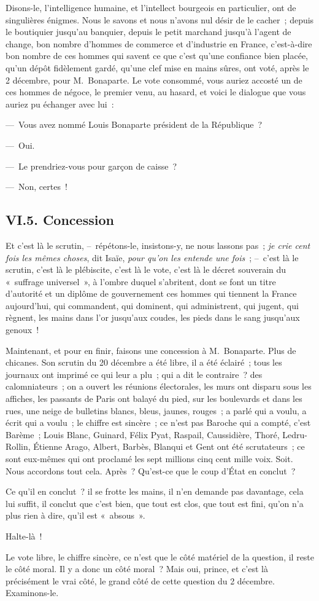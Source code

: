 \documentclass[french,twoside]{book} %
\begin{document}
Disons-le, l’intelligence humaine, et l’intellect bourgeois en particulier, ont de singulières énigmes. Nous le savons et nous n’avons nul désir de le cacher ; depuis le boutiquier jusqu’au banquier, depuis le petit marchand jusqu’à l’agent de change, bon nombre d’hommes de commerce et d’industrie en France, c’est-à-dire bon nombre de ces hommes qui savent ce que c’est qu’une confiance bien placée, qu’un dépôt fidèlement gardé, qu’une clef mise en mains sûres, ont voté, après le 2 décembre, pour M. Bonaparte. Le vote consommé, vous auriez accosté un de ces hommes de négoce, le premier venu, au hasard, et voici le dialogue que vous auriez pu échanger avec lui :\par
— Vous avez nommé Louis Bonaparte président de la République ?\par
— Oui.\par
— Le prendriez-vous pour garçon de caisse ?\par
— Non, certes !
\subsection[{VI.5. Concession}]{VI.5. Concession}
\noindent Et c’est là le scrutin, – répétons-le, insistons-y, ne nous lassons pas ; \emph{je crie cent fois les mêmes choses}, dit Isaïe, \emph{pour qu’on les entende une fois} ; – c’est là le scrutin, c’est là le plébiscite, c’est là le vote, c’est là le décret souverain du « suffrage universel », à l’ombre duquel s’abritent, dont se font un titre d’autorité et un diplôme de gouvernement ces hommes qui tiennent la France aujourd’hui, qui commandent, qui dominent, qui administrent, qui jugent, qui règnent, les mains dans l’or jusqu’aux coudes, les pieds dans le sang jusqu’aux genoux !\par
Maintenant, et pour en finir, faisons une concession à M. Bonaparte. Plus de chicanes. Son scrutin du 20 décembre a été libre, il a été éclairé ; tous les journaux ont imprimé ce qui leur a plu ; qui a dit le contraire ? des calomniateurs ; on a ouvert les réunions électorales, les murs ont disparu sous les affiches, les passants de Paris ont balayé du pied, sur les boulevards et dans les rues, une neige de bulletins blancs, bleus, jaunes, rouges ; a parlé qui a voulu, a écrit qui a voulu ; le chiffre est sincère ; ce n’est pas Baroche qui a compté, c’est Barème ; Louis Blanc, Guinard, Félix Pyat, Raspail, Caussidière, Thoré, Ledru-Rollin, Étienne Arago, Albert, Barbès, Blanqui et Gent ont été scrutateurs ; ce sont eux-mêmes qui ont proclamé les sept millions cinq cent mille voix. Soit. Nous accordons tout cela. Après ? Qu’est-ce que le coup d’État en conclut ?\par
Ce qu’il en conclut ? il se frotte les mains, il n’en demande pas davantage, cela lui suffit, il conclut que c’est bien, que tout est clos, que tout est fini, qu’on n’a plus rien à dire, qu’il est « absous ».\par
Halte-là !\par
Le vote libre, le chiffre sincère, ce n’est que le côté matériel de la question, il reste le côté moral. Il y a donc un côté moral ? Mais oui, prince, et c’est là précisément le vrai côté, le grand côté de cette question du 2 décembre. Examinons-le.
\end{document}
